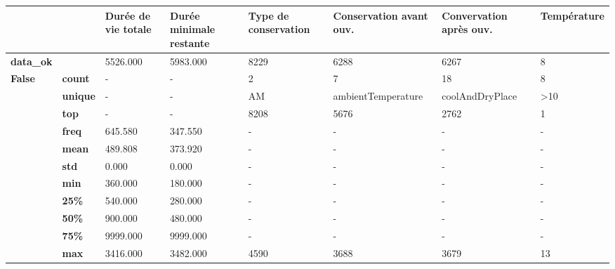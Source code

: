 \begin{tabularx}{\linewidth}{lXXXXXXX}
\toprule
      &     &  Durée de vie totale &  Durée minimale restante & Type de conservation & Conservation avant ouv. & Convervation après ouv. & Température \\
\midrule
\textbf{data\_ok} & {} &             5526.000 &                 5983.000 &                 8229 &                    6288 &                    6267 &           8 \\
\multirow{11}{*}{\textbf{False}} & \textbf{count} &                    - &                        - &                    2 &                       7 &                      18 &           8 \\
      & \textbf{unique} &                    - &                        - &                   AM &      ambientTemperature &         coolAndDryPlace &         >10 \\
      & \textbf{top} &                    - &                        - &                 8208 &                    5676 &                    2762 &           1 \\
      & \textbf{freq} &              645.580 &                  347.550 &                    - &                       - &                       - &           - \\
      & \textbf{mean} &              489.808 &                  373.920 &                    - &                       - &                       - &           - \\
      & \textbf{std} &                0.000 &                    0.000 &                    - &                       - &                       - &           - \\
      & \textbf{min} &              360.000 &                  180.000 &                    - &                       - &                       - &           - \\
      & \textbf{25\%} &              540.000 &                  280.000 &                    - &                       - &                       - &           - \\
      & \textbf{50\%} &              900.000 &                  480.000 &                    - &                       - &                       - &           - \\
      & \textbf{75\%} &             9999.000 &                 9999.000 &                    - &                       - &                       - &           - \\
      & \textbf{max} &             3416.000 &                 3482.000 &                 4590 &                    3688 &                    3679 &          13 \\

\end{tabularx}
